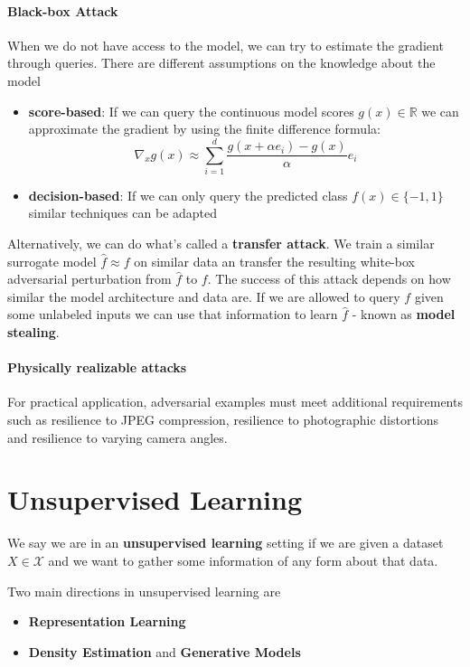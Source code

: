 \documentclass{article}
\newcommand{\R}{\mathbb{R}}
\begin{document}
\paragraph{Black-box Attack}

When we do not have access to the model, we can try to estimate the gradient through queries.
There are different assumptions on the knowledge about the model
\begin{itemize}
    \item \textbf{score-based}: If we can query the continuous model scores $g(x) \in \R$ we can approximate the gradient by using the finite difference formula:
	$$
	\nabla_x g(x) \approx \sum_{i=1}^d \frac{g(x+\alpha e_i) - g(x)}{\alpha}e_i
	$$
    \item \textbf{decision-based}: If we can only query the predicted class $f(x) \in \{-1, 1\}$ similar techniques can be adapted
\end{itemize}

Alternatively, we can do what's called a \textbf{transfer attack}.
We train a similar surrogate model $\hat{f} \approx f$ on similar data an transfer the resulting white-box adversarial perturbation from $\hat{f}$ to $f$.
The success of this attack depends on how similar the model architecture and data are.
If we are allowed to query $f$ given some unlabeled inputs we can use that information to learn $\hat{f}$ - known as \textbf{model stealing}.

\paragraph{Physically realizable attacks}

For practical application, adversarial examples must meet additional requirements such as resilience to JPEG compression, resilience to photographic distortions and resilience to varying camera angles.

\section{Unsupervised Learning}

We say we are in an \textbf{unsupervised learning} setting if we are given a dataset $X \in \mathcal{X}$ and we want to gather some information of any form about that data.

Two main directions in unsupervised learning are
\begin{itemize}
    \item \textbf{Representation Learning}
    \item \textbf{Density Estimation} and \textbf{Generative Models}
\end{itemize}
\end{document}
